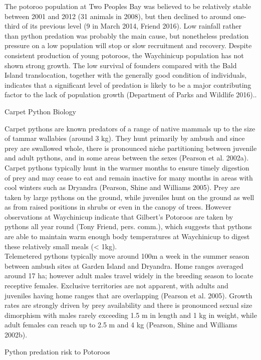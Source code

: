 \documentclass[version=last,
    paper=a4,                               %
    10pt,                                   %
    dvipsnames,
    oneside,                              %
    headings=openany,                       %
    open=any,
    BCOR=7mm,                               %
    DIV=15,     %
]{scrbook}
\begin{document}
The potoroo population at Two Peoples Bay was believed to be relatively
stable between 2001 and 2012 (31 animals in 2008), but then declined to
around one-third of its previous level (9 in March 2014, Friend 2016).
Low rainfall rather than python predation was probably the main cause,
but nonetheless predation pressure on a low population will stop or slow
recruitment and recovery. Despite consistent production of young
potoroos, the Waychinicup population has not shown strong growth. The
low survival of founders compared with the Bald Island translocation,
together with the generally good condition of individuals, indicates
that a significant level of predation is likely to be a major
contributing factor to the lack of population growth (Department of
Parks and Wildlife 2016)..

Carpet Python Biology

Carpet pythons are known predators of a range of native mammals up to
the size of tammar wallabies (around 3 kg). They hunt primarily by
ambush and since prey are swallowed whole, there is pronounced niche
partitioning between juvenile and adult pythons, and in some areas
between the sexes (Pearson et al. 2002a). Carpet pythons typically hunt
in the warmer months to ensure timely digestion of prey and may cease to
eat and remain inactive for many months in areas with cool winters such
as Dryandra (Pearson, Shine and Williams 2005). Prey are taken by large
pythons on the ground, while juveniles hunt on the ground as well as
from raised positions in shrubs or even in the canopy of trees. However
observations at Waychinicup indicate that Gilbert's Potoroos are taken
by pythons all year round (Tony Friend, pers. comm.), which suggests
that pythons are able to maintain warm enough body temperatures at
Waychinicup to digest these relatively small meals (\textless{} 1kg).\\
Telemetered pythons typically move around 100m a week in the summer
season between ambush sites at Garden Island and Dryandra. Home ranges
averaged around 17 ha; however adult males travel widely in the breeding
season to locate receptive females. Exclusive territories are not
apparent, with adults and juveniles having home ranges that are
overlapping (Pearson et al. 2005). Growth rates are strongly driven by
prey availability and there is pronounced sexual size dimorphism with
males rarely exceeding 1.5 m in length and 1 kg in weight, while adult
females can reach up to 2.5 m and 4 kg (Pearson, Shine and Williams
2002b).

Python predation risk to Potoroos
\end{document}
